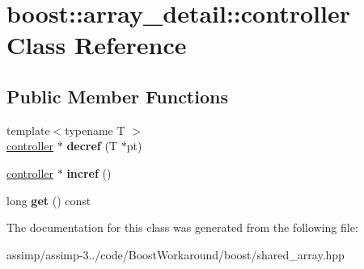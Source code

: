 \hypertarget{classboost_1_1array__detail_1_1controller}{\section{boost\+:\+:array\+\_\+detail\+:\+:controller Class Reference}
\label{classboost_1_1array__detail_1_1controller}
}
\subsection*{Public Member Functions}
\begin{DoxyCompactItemize}
\item 
\hypertarget{classboost_1_1array__detail_1_1controller_a684065cd5616a4af7a01ef6825a4811b}{{\footnotesize template$<$typename T $>$ }\\\hyperlink{classboost_1_1array__detail_1_1controller}{controller} $\ast$ {\bfseries decref} (T $\ast$pt)}\label{classboost_1_1array__detail_1_1controller_a684065cd5616a4af7a01ef6825a4811b}

\item 
\hypertarget{classboost_1_1array__detail_1_1controller_abf5afbd573f3c2196050e6eb5ce54685}{\hyperlink{classboost_1_1array__detail_1_1controller}{controller} $\ast$ {\bfseries incref} ()}\label{classboost_1_1array__detail_1_1controller_abf5afbd573f3c2196050e6eb5ce54685}

\item 
\hypertarget{classboost_1_1array__detail_1_1controller_ad55780763c09090c1b42706148540a93}{long {\bfseries get} () const }\label{classboost_1_1array__detail_1_1controller_ad55780763c09090c1b42706148540a93}

\end{DoxyCompactItemize}


The documentation for this class was generated from the following file\+:\begin{DoxyCompactItemize}
\item 
assimp/assimp-\/3../code/\+Boost\+Workaround/boost/shared\+\_\+array.\+hpp\end{DoxyCompactItemize}
